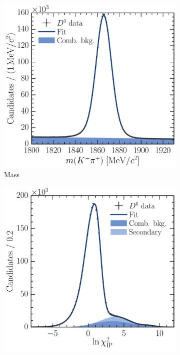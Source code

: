 \begin{figure}
  \begin{subfigure}[b]{0.5\textwidth}
    \centering
    \includegraphics[width=\textwidth]{figures/production/fitting/D0ToKpi_mass_fit_pT_integrated_y_integrated}
    \caption{Mass}
    \label{fig:prod:fitting:D0ToKpi:mass}
  \end{subfigure}
  \begin{subfigure}[b]{0.5\textwidth}
    \centering
    \includegraphics[width=\textwidth]{figures/production/fitting/D0ToKpi_ipchisq_fit_pT_integrated_y_integrated}

\end{subfigure}
\end{figure}
